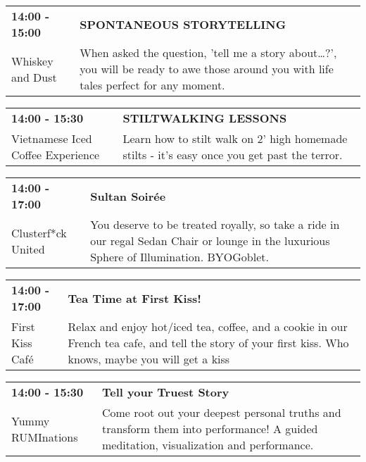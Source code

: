 \begin{tabular}{ p{1in} p{2.2in} }
    \textbf{14:00 - 15:00} & \textbf{SPONTANEOUS STORYTELLING} \\
    Whiskey and Dust \newline  & When asked the question, 'tell me a story about\ldots ?', you will be ready to awe those around you with life tales perfect for any moment. \\
    \hline 
\end{tabular}
    
\begin{tabular}{ p{1in} p{2.2in} }
    \textbf{14:00 - 15:30} & \textbf{STILTWALKING LESSONS} \\
    Vietnamese Iced Coffee Experience \newline  & Learn how to stilt walk on 2' high homemade stilts - it's easy once you get past the terror. \\
    \hline 
\end{tabular}
    
\begin{tabular}{ p{1in} p{2.2in} }
    \textbf{14:00 - 17:00} & \textbf{Sultan Soir\'ee} \\
    Clusterf*ck United \newline  & You deserve to be treated royally, so take a ride in our regal Sedan Chair or lounge in the luxurious Sphere of Illumination. BYOGoblet. \\
    \hline 
\end{tabular}
    
\begin{tabular}{ p{1in} p{2.2in} }
    \textbf{14:00 - 17:00} & \textbf{Tea Time at First Kiss!} \\
    First Kiss Caf\'e \newline  & Relax and enjoy hot/iced tea, coffee, and a cookie in our French tea cafe, and tell the story of your first kiss. Who knows, maybe you will get a kiss \\
    \hline 
\end{tabular}
    
\begin{tabular}{ p{1in} p{2.2in} }
    \textbf{14:00 - 15:30} & \textbf{Tell your Truest Story} \\
    Yummy RUMInations \newline  & Come root out your deepest personal truths and transform them into performance!  A guided meditation, visualization and performance. \\
    \hline 
\end{tabular}
    
